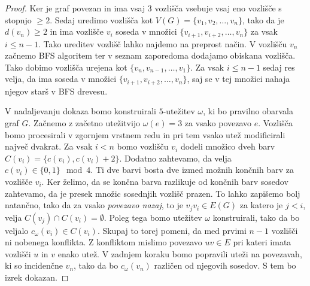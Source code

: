 \documentclass[12pt,a4paper,twoside]{article}
\theoremstyle{definition} %
\theoremstyle{plain} %
\numberwithin{equation}{section}  %
\begin{document}
\begin{proof}
	Ker je graf povezan in ima vsaj 3 vozlišča vsebuje vsaj eno vozlišče s stopnjo $\ge 2$. Sedaj uredimo vozlišča kot $V(G) = \{ v_1, v_2, \ldots, v_n\}$, tako da je $d(v_n) \ge 2$ in ima vozlišče $v_i$ soseda v množici $\{v_{i+1}, v_{i+2}, \ldots, v_n\}$ za vsak $i \le n-1$. Tako ureditev vozlišč lahko najdemo na preprost način. V vozlišču $v_n$ začnemo BFS algoritem ter v seznam zaporedoma dodajamo obiskana vozlišča. Tako dobimo vozlišča urejena kot $\{v_n, v_{n-1}, \ldots, v_1\}$. Za vsak $i \le n-1$ sedaj res velja, da ima soseda v množici   $\{v_{i+1}, v_{i+2}, \ldots, v_n\}$, saj se v tej množici nahaja njegov starš v BFS drevesu.

V nadaljevanju dokaza bomo konstruirali $5$-utežitev $\omega$, ki bo pravilno obarvala graf $G$. Začnemo z začetno utežitvijo $\omega(e) = 3$ za vsako povezavo $e$. Vozlišča bomo procesirali v zgornjem vrstnem redu in pri tem vsako utež modificirali največ dvakrat. Za vsak $i < n$ bomo vozlišču $v_i$ dodeli množico dveh barv $C(v_i) = \{c(v_i), c(v_i) + 2\}$. Dodatno zahtevamo, da velja $c(v_i) \in \{0,1\}  \mod 4$. Ti dve barvi bosta dve izmed možnih končnih barv za vozlišče $v_i$. Ker želimo, da se končna barva razlikuje od končnih barv sosedov zahtevamo, da je presek množic sosednjih vozlišč prazen. To lahko zapišemo bolj natančno, tako da za vsako \textit{povezavo nazaj}, to je $v_jv_i \in E(G)$ za katero je $j < i$, velja $C(v_j) \cap C(v_i) =\emptyset$. Poleg tega bomo utežitev $\omega$ konstruirali, tako da bo veljalo $c_{\omega}(v_i) \in C(v_i)$. Skupaj to torej pomeni, da med prvimi $n-1$ vozlišči ni nobenega konflikta. Z konfliktom mislimo povezavo $uv \in E$ pri kateri imata vozlišči $u$ in $v$ enako utež. V zadnjem koraku bomo popravili uteži na povezavah, ki so incidenčne $v_n$, tako da bo $c_{\omega}(v_n)$ različen od njegovih sosedov. S tem bo izrek dokazan.


\end{proof}
\end{document}
